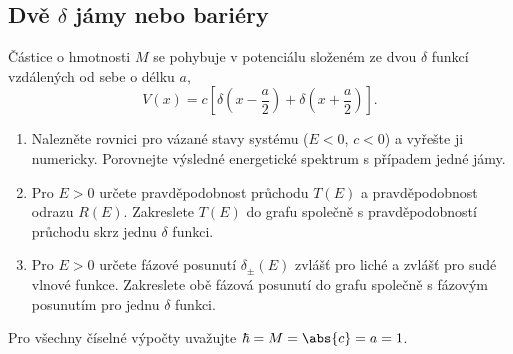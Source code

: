 \subsection{Dvě $\delta$ jámy nebo bariéry}\label{sec:DoubleDelta}
Částice o hmotnosti $M$ se pohybuje v potenciálu složeném ze dvou $\delta$ funkcí vzdálených od sebe o délku $a$,
\begin{equation}\label{eq:HamiltonianDoubleDelta}
    V(x)=c\left[\delta\left(x-\frac{a}{2}\right)+\delta\left(x+\frac{a}{2}\right)\right].
\end{equation}

\begin{enumerate}
\item
    Nalezněte rovnici pro vázané stavy systému ($E<0$, $c<0$) a vyřešte ji numericky.
    Porovnejte výsledné energetické spektrum s případem jedné jámy.
    
\item
    Pro $E>0$ určete pravděpodobnost průchodu $T(E)$ a pravděpodobnost odrazu $R(E)$.
    Zakreslete $T(E)$ do grafu společně s pravděpodobností průchodu skrz jednu $\delta$ funkci.
    
\item
    Pro $E>0$ určete fázové posunutí $\delta_{\pm}(E)$ zvlášť pro liché a zvlášť pro sudé vlnové funkce.
    Zakreslete obě fázová posunutí do grafu společně s fázovým posunutím pro jednu $\delta$ funkci.
\end{enumerate}

Pro všechny číselné výpočty uvažujte $\hbar=M=\abs{c}=a=1$.
	
